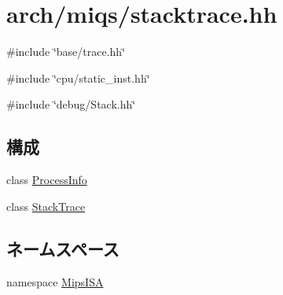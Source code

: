 \hypertarget{miqs_2stacktrace_8hh}{
\section{arch/miqs/stacktrace.hh}
\label{miqs_2stacktrace_8hh}
}
{\ttfamily \#include \char`\"{}base/trace.hh\char`\"{}}\par
{\ttfamily \#include \char`\"{}cpu/static\_\-inst.hh\char`\"{}}\par
{\ttfamily \#include \char`\"{}debug/Stack.hh\char`\"{}}\par
\subsection*{構成}
\begin{DoxyCompactItemize}
\item 
class \hyperlink{classMipsISA_1_1ProcessInfo}{ProcessInfo}
\item 
class \hyperlink{classMipsISA_1_1StackTrace}{StackTrace}
\end{DoxyCompactItemize}
\subsection*{ネームスペース}
\begin{DoxyCompactItemize}
\item 
namespace \hyperlink{namespaceMipsISA}{MipsISA}
\end{DoxyCompactItemize}
